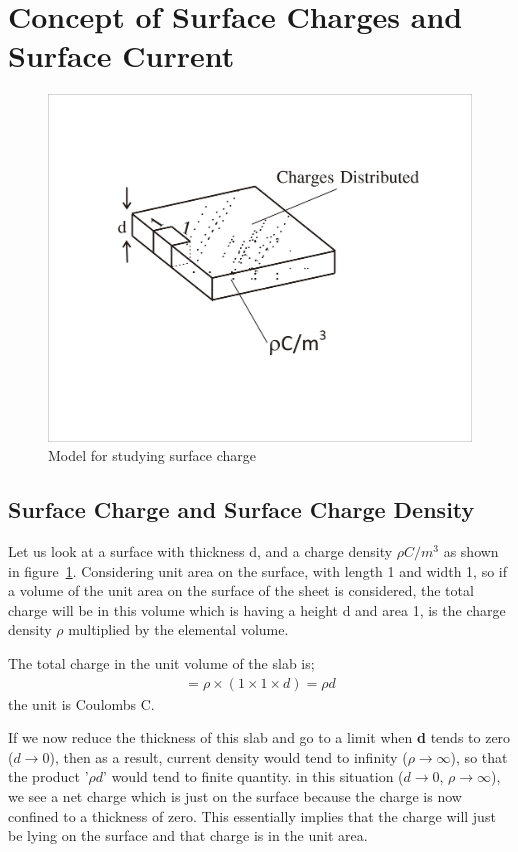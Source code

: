 \section{Concept of Surface Charges and Surface Current}
\begin{figure}[h]
\centering
\includegraphics[width=.7\linewidth]{./graphics/surfacecharge}
\caption{Model for studying surface charge}
\label{fig:surfacecharge}
\end{figure} 

\subsection{Surface Charge and Surface Charge Density}
Let us look at a surface with thickness d, and a charge density $\rho$$C/m^{3}$ as shown in figure~\ref{fig:surfacecharge}. Considering unit area on the surface, with length 1 and width 1, so if a volume of the unit area on the surface of the sheet is considered, the total charge will be in this volume which is having a height d and area 1, is the charge density $\rho$ multiplied by the elemental volume.

The total charge in the unit volume of the slab is;
\begin{align*}
=\rho\times(1\times 1\times d)=\rho d
\end{align*}
the unit is Coulombs C.

If we now reduce the thickness of this slab and go to a limit when \textbf{d} tends to zero ($d\rightarrow 0$), then as a result, current density would tend to infinity ($\rho\rightarrow\infty$), so that the product '$\rho d$' would tend to finite quantity. in this situation ($d\rightarrow 0$, $\rho\rightarrow\infty$), we see a net charge which is just on the surface because the charge is now confined to a thickness of zero. This essentially implies that the charge will just be lying on the surface and that charge is in the unit area. 


